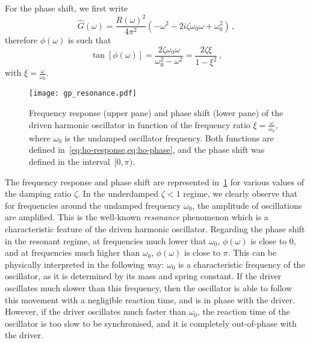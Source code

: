 For the phase shift, we first write
\begin{equation}
  \hat{G}(\omega)=\frac{R(\omega)^2}{4\pi^2}(-\omega^2-2i\zeta\omega_0\omega+\omega_0^2)\,,
\end{equation}
therefore $\phi(\omega)$ is such that
\begin{equation}
  \tan[\phi(\omega)]=\frac{2\zeta\omega_0\omega}{\omega_0^2-\omega^2}
  =\frac{2\zeta\xi}{1-\xi^2}\,,
  \label{eq:ho-phase}
\end{equation}
with $\xi=\frac{\omega}{\omega_0}$.
\begin{figure}[p]
  \centering
  \texttt{[image: gp\_resonance.pdf]}
  \caption{Frequency response (upper pane) and phase shift (lower pane) of the driven
    harmonic oscillator in function of the frequency ratio $\xi=\frac{\omega}{\omega_0}$,
    where $\omega_0$ is the undamped oscillator frequency. Both functions are defined
    in~\cref{eq:ho-response,eq:ho-phase}, and the phase shift was defined in the
  interval~$[0,\pi)$.}
  \label{fig:resonance}
\end{figure}

The frequency response and phase shift are represented in~\cref{fig:resonance} for various
values of the damping ratio $\zeta$. In the underdamped $\zeta<1$ regime, we clearly
observe that for frequencies around the undamped frequency $\omega_0$, the amplitude of
oscillations are amplified. This is the well-known \emph{resonance} phenomenon which is a
characteristic feature of the driven harmonic oscillator. Regarding the phase shift in the
resonant regime, at frequencies much lower that $\omega_0$, $\phi(\omega)$ is close to
$0$, and at frequencies much higher than $\omega_0$, $\phi(\omega)$ is close to $\pi$.
This can be physically interpreted in the following way: $\omega_0$ is a characteristic
frequency of the oscillator, as it is determined by its mass and spring constant. If the
driver oscillates much slower than this frequency, then the oscillator is able to follow
this movement with a negligible reaction time, and is in phase with the driver. However,
if the driver oscillates much faster than $\omega_0$, the reaction time of the oscillator
is too slow to be synchronised, and it is completely out-of-phase with the driver.
